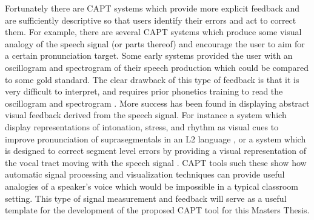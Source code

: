 Fortunately there are CAPT systems which provide more explicit feedback and are sufficiently descriptive so that users identify their errors and act to correct them. For example, there are several CAPT systems which produce some visual analogy of the speech signal (or parts thereof) and encourage the user to aim for a certain pronunciation target\cite{neri2002pedagogy}. Some early systems provided the user with an oscillogram and spectrogram of their speech production which could be compared to some gold standard. The clear drawback of this type of feedback is that it is very difficult to interpret, and requires prior phonetics training to read the oscillogram and spectrogram \cite{hansen2006computer}. More success has been found in displaying abstract visual feedback derived from the speech signal. For instance a system which display representations of intonation, stress, and rhythm as visual cues to improve pronunciation of suprasegmentals in an L2 language \cite{kommissarchik2000better}, or a system which is designed to correct segment level errors by providing a visual representation of the vocal tract moving with the speech signal \cite{wong2011allophonic}. CAPT tools such these show how automatic signal processing and visualization techniques can provide useful analogies of a speaker's voice which would be impossible in a typical classroom setting. This type of signal measurement and feedback will serve as a useful template for the development of the proposed CAPT tool for this Masters Thesis.


